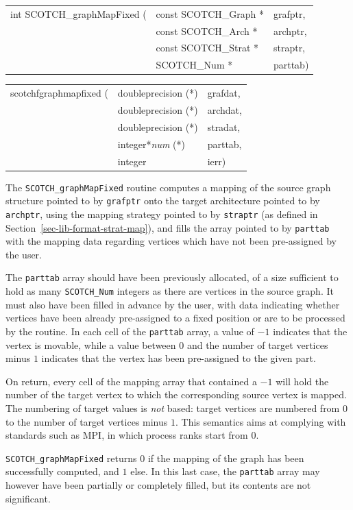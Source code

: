 \begin{itemize}
\progsyn

{\tt\begin{tabular}{l@{}ll}
int SCOTCH\_graphMapFixed ( & const SCOTCH\_Graph * & grafptr, \\
                            & const SCOTCH\_Arch *  & archptr, \\
                            & const SCOTCH\_Strat * & straptr, \\
                            & SCOTCH\_Num *         & parttab)
\end{tabular}}

{\tt\begin{tabular}{l@{}ll}
scotchfgraphmapfixed ( & doubleprecision (*)   & grafdat, \\
                       & doubleprecision (*)   & archdat, \\
                       & doubleprecision (*)   & stradat, \\
                       & integer*{\it num} (*) & parttab, \\
                       & integer               & ierr)
\end{tabular}}

\progdes

The {\tt SCOTCH\_graphMapFixed} routine computes a mapping of the
source graph structure pointed to by {\tt grafptr} onto the target
architecture pointed to by {\tt archptr}, using the mapping strategy
pointed to by {\tt straptr} (as defined in
Section~\ref{sec-lib-format-strat-map}), and fills the array pointed
to by {\tt parttab} with the mapping data regarding vertices which
have not been pre-assigned by the user.

The {\tt parttab} array should have been previously allocated, of a
size sufficient to hold as many {\tt SCOTCH\_\lbt Num} integers as
there are vertices in the source graph. It must also have been filled
in advance by the user, with data indicating whether vertices have
been already pre-assigned to a fixed position or are to be processed
by the routine. In each cell of the {\tt parttab} array, a value of
$-1$ indicates that the vertex is movable, while a value between $0$
and the number of target vertices minus $1$ indicates that the vertex
has been pre-assigned to the given part.

On return, every cell of the mapping array that contained a $-1$ will
hold the number of the target vertex to which the corresponding source
vertex is mapped. The numbering of target values is {\em not\/}
based: target vertices are numbered from $0$ to the number of target
vertices minus $1$. This semantics aims at complying with standards
such as MPI, in which process ranks start from $0$.

\progret

{\tt SCOTCH\_graphMapFixed} returns $0$ if the mapping of the graph
has been successfully computed, and $1$ else. In this last case, the
{\tt parttab} array may however have been partially or completely
filled, but its contents are not significant.
\end{itemize}

